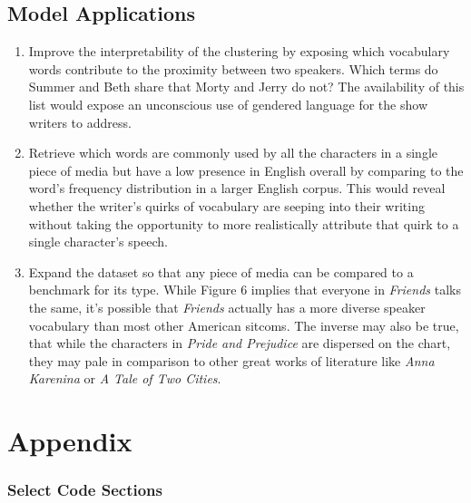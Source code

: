 \documentclass{article}
\begin{document}
\begin{titlepage}
\subsection{Model Applications}

\begin{enumerate}
\item Improve the interpretability of the clustering by exposing which vocabulary words contribute to the proximity between two speakers. Which terms do Summer and Beth share that Morty and Jerry do not? The availability of this list would expose an unconscious use of gendered language for the show writers to address.
\item Retrieve which words are commonly used by all the characters in a single piece of media but have a low presence in English overall by comparing to the word's frequency distribution in a larger English corpus. This would reveal whether the writer's quirks of vocabulary are seeping into their writing without taking the opportunity to more realistically attribute that quirk to a single character's speech.
\item Expand the dataset so that any piece of media can be compared to a benchmark for its type. While Figure 6 implies that everyone in \textit{Friends} talks the same, it's possible that \textit{Friends} actually has a more diverse speaker vocabulary than most other American sitcoms. The inverse may also be true, that while the characters in \textit{Pride and Prejudice} are dispersed on the chart, they may pale in comparison to other great works of literature like \textit{Anna Karenina} or \textit{A Tale of Two Cities}.
\end{enumerate}

\begin{enumerate}

\end{enumerate}

\section{Appendix}
\subsubsection{Select Code Sections}


\end{titlepage}
\end{document}
